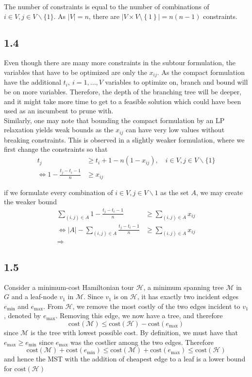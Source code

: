 \documentclass[12pt]{article}
\begin{document}
The number of constraints is equal to the number of combinations of $i \in V, j \in V \backslash\{1\}$. As $|V| = n$, there are $\left|V \times V \setminus \left\{1\right\} \right| = n(n-1)$ constraints.


\subsection*{1.4}

Even though there are many more constraints in the subtour formulation, the variables that have to be optimized are only the $x_{ij}$. As the compact formulation have the additional $t_i, \ i = 1,...,V$ variables to optimize on, branch and bound will be on more variables. Therefore, the depth of the branching tree will be deeper, and it might take more time to get to a feasible solution which could have been used as an incumbent to prune with.\\

Similarly, one may note that bounding the compact formulation by an LP relaxation yields weak bounds as the $x_{ij}$ can have very low values without breaking constraints. This is observed in a slightly weaker formulation, where we first change the constraints so that
\begin{align*}
t_j & \geq t_i + 1 - n(1 - x_{ij}), \quad i\in V, j\in V\backslash \{1\}\\
\Leftrightarrow 1 - \frac{t_j - t_i - 1}{n} & \geq x_{ij}
\end{align*}

if we formulate every combination of $i\in V, j \in V\backslash {1}$ as the set $A$, we may create the weaker bound
\begin{align*}
\sum_{(i,j)\in A} 1 - \frac{t_j - t_i - 1}{n} & \geq \sum_{(i,j)\in A} x_{ij}\\
\Leftrightarrow |A| - \sum_{(i,j)\in A} \frac{t_j - t_i - 1}{n} & \geq \sum_{(i,j)\in A} x_{ij}\\
\Rightarrow 
\end{align*}

\subsection*{1.5} 
Consider a minimum-cost Hamiltonian tour $\mathcal{H}$, a minimum spanning tree $\mathcal{M}$ in $G$ and a leaf-node $v_1$ in $\mathcal{M}$. Since $v_1$ is on $\mathcal{H}$, it has exactly two incident edges $e_\text{min}$ and $e_{\text{max}}$. From $\mathcal{H}$, we remove the most costly of the two edges incident to $v_1$, denoted by $e_{\max}$. Removing this edge, we now have a tree, and therefore
$$
\text{cost}(\mathcal{M}) \leq \text{cost}(\mathcal{H}) - \text{cost}(e_{\max})
$$
since $\mathcal{M}$ is the tree with lowest possible cost. By definition, we must have that $e_{\max} \geq e_\text{min}$ since $e_\text{max}$ was the costlier among the two edges. Therefore
$$
\text{cost}(\mathcal{M}) + \text{cost}(e_\text{min}) \leq \text{cost}(\mathcal{M}) + \text{cost}(e_\text{max}) \leq \text{cost}(\mathcal{H})
$$
and hence the MST with the addition of cheapest edge to a leaf is a lower bound for $\text{cost}(\mathcal{H})$
\end{document}
